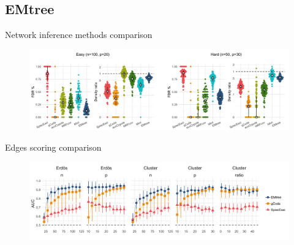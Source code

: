 \documentclass[11pt]{beamer}
\begin{document}
 \subsection{EMtree}
 \begin{frame}{Network inference methods comparison}
 \begin{figure}
 \includegraphics[width=\linewidth]{images/panel_erdos_6methods.png}\\
 \end{figure}
 \end{frame}
 \begin{frame}{Edges scoring comparison}
 \begin{figure}
  \includegraphics[width=\linewidth]{images/panel_npfav.png}
 \end{figure}
 \end{frame}
\end{document}
